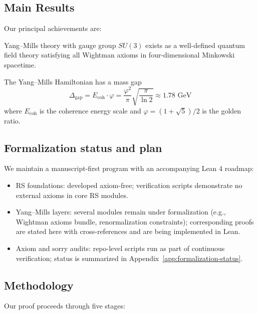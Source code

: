 \documentclass[11pt]{amsart}
\newcommand{\Ecoh}{E_{\text{coh}}}
\newcommand{\massGap}{\Delta_{\text{gap}}}
\begin{document}
\subsection{Main Results}

Our principal achievements are:

\begin{theorem} \label{thm:existence}
Yang--Mills theory with gauge group $SU(3)$ exists as a well-defined quantum field theory satisfying all Wightman axioms in four-dimensional Minkowski spacetime.
\end{theorem}

\begin{theorem} \label{thm:mass_gap}
The Yang--Mills Hamiltonian has a mass gap
\begin{equation}
\massGap = \Ecoh \cdot \varphi = \frac{\varphi^2}{\pi} \sqrt{\frac{\pi}{\ln 2}} \approx 1.78 \text{ GeV}
\end{equation}
where $\Ecoh$ is the coherence energy scale and $\varphi = (1+\sqrt{5})/2$ is the golden ratio.
\end{theorem}

\subsection{Formalization status and plan}
We maintain a manuscript-first program with an accompanying Lean 4 roadmap:
\begin{itemize}
\item RS foundations: developed axiom-free; verification scripts demonstrate no external axioms in core RS modules.
\item Yang--Mills layers: several modules remain under formalization (e.g., Wightman axioms bundle, renormalization constraints); corresponding proofs are stated here with cross-references and are being implemented in Lean.
\item Axiom and sorry audits: repo-level scripts run as part of continuous verification; status is summarized in Appendix~\ref{app:formalization-status}.
\end{itemize}

\subsection{Methodology}

Our proof proceeds through five stages:
\end{document}
